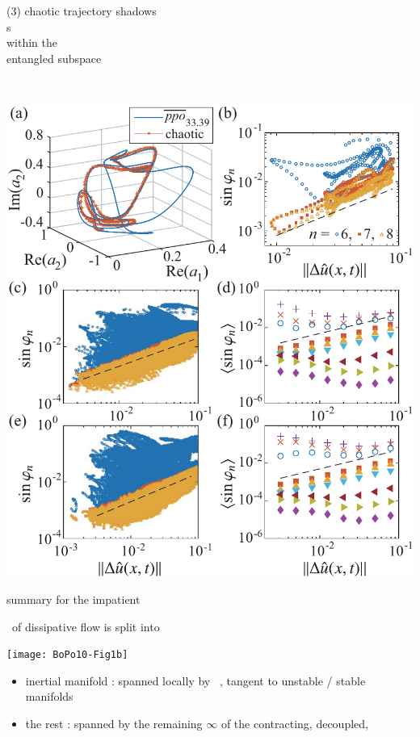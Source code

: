 \begin{frame}{}
    \begin{minipage}[b]{0.35\textwidth}
\begin{block}{(3)}
chaotic trajectory shadows \\
\po s
\\within the
\\
entangled subspace
\end{block}
    \end{minipage}
~
    \begin{minipage}[b]{0.61\textwidth}
\begin{center}
\includegraphics[width=1.00\textwidth]{../../dimension/ks22vecShadow}
\end{center}
    \end{minipage}
\end{frame}

\begin{frame}{summary for the impatient}
\begin{block}{\statesp\ of dissipative flow is split into}
\begin{center}
\texttt{[image: BoPo10-Fig1b]}
\end{center}
\end{block}
\begin{itemize}
  \item inertial manifold :
spanned locally by
\textcolor{red}{\entangled\ \cLvs}, tangent to unstable / stable manifolds
  \item the rest : spanned by the remaining
$\infty$ of the contracting, decoupled,
\textcolor{blue}{\transient\ \cLvs}
\end{itemize}
\end{frame}

